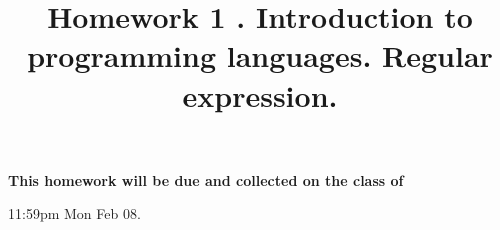 \documentclass[12pt, letterpaper]{article}
\date{}
\newcommand{\hwnumber} {
    1
}
\newcommand{\hwtitle} {
  Introduction to programming languages. Regular expression. 
}
\newcommand{\duedate}{
    11:59pm Mon Feb 08.
}
\begin{document}
\newcommand{\hide}[1]{}
\newcommand{\otherquestions}[1]{}
\newcommand{\set}[1]{\{#1\}}
\newcommand{\pg}[1]{{\tt #1}}
\newtheorem{definition}{Definition}
\newcommand{\emptyclause}{\Box}
\newcommand{\keyword}[1]{{\bf #1}}

\newcommand{\ee}[1] {
  \begin{enumerate}
    #1
  \end{enumerate}
}

\newcommand{\ie}[1] {
  \begin{enumerate}
    #1
  \end{enumerate}
}

\newcommand{\kleene}{\wedge}

\title{{\bf Homework \hwnumber.} \hwtitle}

\maketitle





\fancyhf{}
\thispagestyle{fancy}
%
\cfoot{\thepage}

{\bf This homework will be due and collected on the class of
 \duedate}
\end{document}
